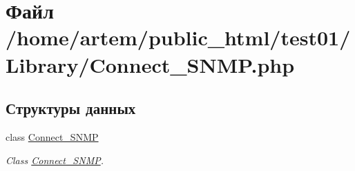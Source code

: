 \hypertarget{_connect___s_n_m_p_8php}{\section{Файл /home/artem/public\-\_\-html/test01/\-Library/\-Connect\-\_\-\-S\-N\-M\-P.php}
\label{_connect___s_n_m_p_8php}
}
\subsection*{Структуры данных}
\begin{DoxyCompactItemize}
\item 
class \hyperlink{class_connect___s_n_m_p}{Connect\-\_\-\-S\-N\-M\-P}
\begin{DoxyCompactList}\small\item\em Class \hyperlink{class_connect___s_n_m_p}{Connect\-\_\-\-S\-N\-M\-P}. \end{DoxyCompactList}\end{DoxyCompactItemize}
